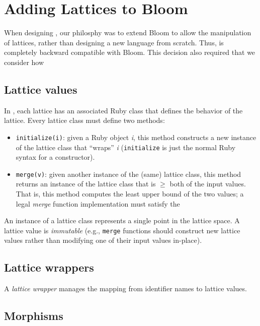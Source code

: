 \section{Adding Lattices to Bloom}
\label{sec:impl}


When designing \lang, our philosphy was to extend Bloom to allow the
manipulation of lattices, rather than designing a new language from
scratch. Thus, \lang is completely backward compatible with Bloom. This decision
also required that we consider how 

\subsection{Lattice values}
In \lang, each lattice has an associated Ruby class that defines the behavior of
the lattice. Every lattice class must define two methods:
\begin{itemize}
\item \texttt{initialize(i)}: given a Ruby object \emph{i}, this method
  constructs a new instance of the lattice class that ``wraps'' \emph{i}
  (\texttt{initialize} is just the normal Ruby syntax for a constructor).
\item \texttt{merge(v)}: given another instance of the (same) lattice class,
  this method returns an instance of the lattice class that is $\ge$ both of the
  input values. That is, this method computes the least upper bound of the two
  values; a legal \emph{merge} function implementation must satisfy the 
\end{itemize}
An instance of a lattice class represents a single point in the lattice space. A
lattice value is \emph{immutable} (e.g., \texttt{merge} functions should
construct new lattice values rather than modifying one of their input values
in-place). 

\subsection{Lattice wrappers}
A \emph{lattice wrapper} manages the mapping from identifier names to lattice
values.

\subsection{Morphisms}

